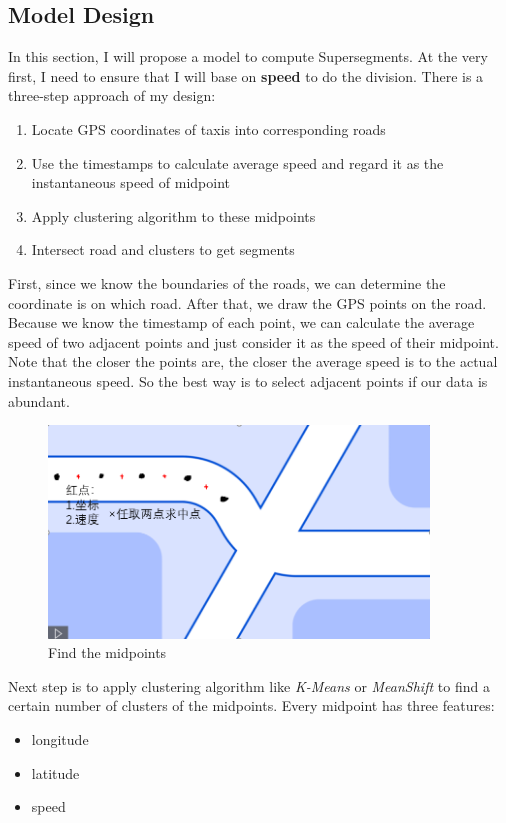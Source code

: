 \documentclass[fontset=none]{ctexart}
\theoremstyle{definition}
\theoremstyle{remark}
\begin{document}
\subsection{Model Design}
In this section, I will propose a model to compute Supersegments.
At the very first, I need to ensure that I will base on \textbf{speed} to do the division.
There is a three-step approach of my design:
\begin{enumerate}
    \item Locate GPS coordinates of taxis into corresponding roads
    \item Use the timestamps to calculate average speed and regard it as the instantaneous speed of midpoint
    \item Apply clustering algorithm to these midpoints
    \item Intersect road and clusters to get segments
\end{enumerate}

First, since we know the boundaries of the roads, we can determine the coordinate is on which road.
After that, we draw the GPS points on the road. Because we know the timestamp of each point, we can 
calculate the average speed of two adjacent points and just consider it as the speed of their midpoint.
Note that the closer the points are, the closer the average speed is to the actual instantaneous speed.
So the best way is to select adjacent points if our data is abundant.
\begin{figure}[htb]
  \centering
  \includegraphics[width=0.9\textwidth]{images/midpoints.png}
  \caption{Find the midpoints}
  \label{fig: midpoint}
\end{figure}

Next step is to apply clustering algorithm like \textit{K-Means} or \textit{MeanShift} to find a certain number of clusters
of the midpoints.
Every midpoint has three features:
\begin{itemize}
  \item longitude
  \item latitude
  \item speed
\end{itemize}
\end{document}
